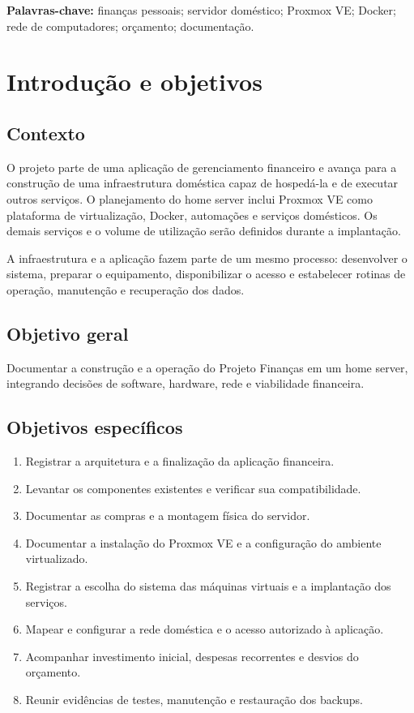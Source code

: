 \documentclass[11pt,a4paper,oneside]{report}
\begin{document}
\textbf{Palavras-chave:} finanças pessoais; servidor doméstico; Proxmox VE; Docker;
rede de computadores; orçamento; documentação.

\tableofcontents
\clearpage

\chapter{Introdução e objetivos}
\section{Contexto}
O projeto parte de uma aplicação de gerenciamento financeiro e avança para a
construção de uma infraestrutura doméstica capaz de hospedá-la e de executar
outros serviços. O planejamento do home server inclui Proxmox VE como plataforma
de virtualização, Docker, automações e serviços domésticos.
Os demais serviços e o volume de utilização serão
definidos durante a implantação.

A infraestrutura e a aplicação fazem parte de um mesmo processo: desenvolver
o sistema, preparar o equipamento, disponibilizar o acesso e estabelecer
rotinas de operação, manutenção e recuperação dos dados.

\section{Objetivo geral}
Documentar a construção e a operação do Projeto Finanças em um home server,
integrando decisões de software, hardware, rede e viabilidade financeira.

\section{Objetivos específicos}
\begin{enumerate}
\item Registrar a arquitetura e a finalização da aplicação financeira.
\item Levantar os componentes existentes e verificar sua compatibilidade.
\item Documentar as compras e a montagem física do servidor.
\item Documentar a instalação do Proxmox VE e a configuração do ambiente virtualizado.
\item Registrar a escolha do sistema das máquinas virtuais e a implantação dos serviços.
\item Mapear e configurar a rede doméstica e o acesso autorizado à aplicação.
\item Acompanhar investimento inicial, despesas recorrentes e desvios do orçamento.
\item Reunir evidências de testes, manutenção e restauração dos backups.
\end{enumerate}
\end{document}
